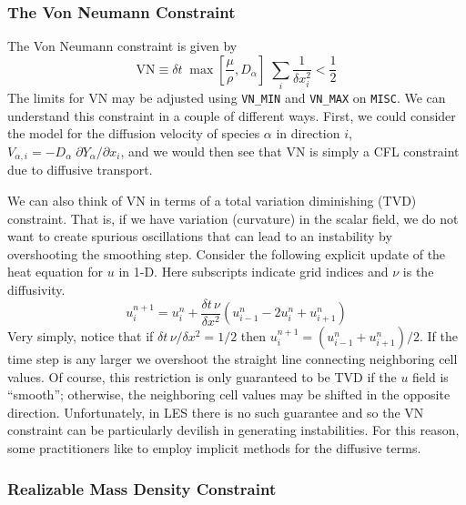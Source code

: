 \documentclass[11pt]{book}
\newcommand{\ct}{\tt\small}
\begin{document}
\subsubsection{The Von Neumann Constraint}

The Von Neumann constraint is given by
\begin{equation}
\mbox{VN} \equiv  \delta t \; \max \left[ \frac{\mu}{\rho},D_\alpha \right] \; \sum_i \frac{1}{\delta x_i^2} < \frac{1}{2}
\end{equation}
The limits for VN may be adjusted using {\ct VN\_MIN} and {\ct VN\_MAX} on {\ct MISC}. We can understand this constraint in a couple of different ways.  First, we could consider the model for the diffusion velocity of species $\alpha$ in direction $i$, $V_{\alpha,i} = -D_\alpha \; \partial Y_\alpha/\partial x_i$, and we would then see that VN is simply a CFL constraint due to diffusive transport.

We can also think of VN in terms of a total variation diminishing (TVD) constraint.  That is, if we have variation (curvature) in the scalar field, we do not want to create spurious oscillations that can lead to an instability by overshooting the smoothing step.  Consider the following explicit update of the heat equation for $u$ in 1-D. Here subscripts indicate grid indices and $\nu$ is the diffusivity.
\begin{equation}
u_i^{n+1} = u_i^n + \frac{\delta t \, \nu}{\delta x^2} (u_{i-1}^n - 2u_i^n + u_{i+1}^n )
\end{equation}
Very simply, notice that if $\delta t \, \nu/\delta x^2 = 1/2$ then $u_i^{n+1} = (u_{i-1}^n + u_{i+1}^n)/2$.  If the time step is any larger we overshoot the straight line connecting neighboring cell values.  Of course, this restriction is only guaranteed to be TVD if the $u$ field is ``smooth''; otherwise, the neighboring cell values may be shifted in the opposite direction.  Unfortunately, in LES there is no such guarantee and so the VN constraint can be particularly devilish in generating instabilities. For this reason, some practitioners like to employ implicit methods for the diffusive terms.

\subsubsection{Realizable Mass Density Constraint}
\end{document}
